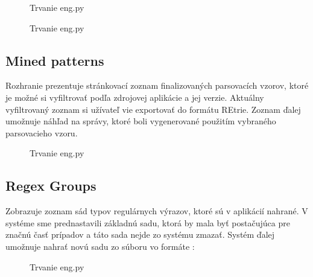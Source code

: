 \begin{figure}[htbp]
 \centering 
 \begin{minipage}{0.95\linewidth}
 	\centering
 \end{minipage}
  \caption{Trvanie eng.py }
  \label{fig:eng-duration}
\end{figure}

\begin{figure}[htbp]
 \centering 
 \begin{minipage}{0.95\linewidth}
 	\centering
 \end{minipage}
  \caption{Trvanie eng.py }
  \label{fig:eng-duration}
\end{figure}

\subsection{Mined patterns}
Rozhranie prezentuje stránkovací zoznam finalizovaných parsovacích vzorov, ktoré je možné si vyfiltrovať podľa zdrojovej aplikácie a jej verzie. Aktuálny vyfiltrovaný zoznam si užívateľ vie exportovať do formátu REtrie. Zoznam ďalej umožnuje náhľad na správy, ktoré boli vygenerované použitím vybraného parsovacieho vzoru. 

\begin{figure}[htbp]
 \centering 
 \begin{minipage}{0.95\linewidth}
 	\centering
 \end{minipage}
  \caption{Trvanie eng.py }
  \label{fig:eng-duration}
\end{figure}

\subsection{Regex Groups}
Zobrazuje zoznam sád typov regulárnych výrazov, ktoré sú v aplikácií nahrané. V systéme sme prednastavili základnú sadu, ktorá by mala byť postačujúca pre značnú časť prípadov a táto sada nejde zo systému zmazať. Systém ďalej umožnuje nahrať novú sadu zo súboru vo formáte :

 \begin{figure}[htbp]
 \centering 
 \begin{minipage}{0.95\linewidth}
 	\centering
 \end{minipage}
  \caption{Trvanie eng.py }
  \label{fig:eng-duration}
\end{figure}

